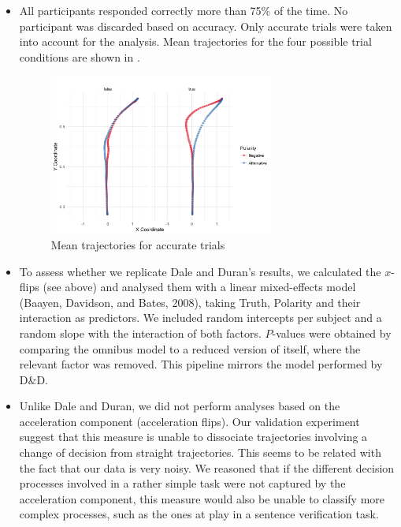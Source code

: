 \documentclass{article}
\begin{document}
\begin{itemize}
\item All participants responded correctly more than 75\% of the time. No participant was discarded based on accuracy.  Only accurate trials were taken into account for the analysis. Mean trajectories for the four possible trial conditions are shown in . 

\begin{figure}
\centering
\includegraphics[width=0.7\textwidth]{negation-data-mean-trajectory.png}
\caption{Mean trajectories for accurate trials} \label{fig:mean.trajectory-negation}
\end{figure}

\item To assess whether we replicate Dale and Duran's results, we calculated the $x$-flips (see above) and analysed them with a linear mixed-effects model (Baayen, Davidson, and Bates, 2008), taking Truth, Polarity and their interaction as predictors. We included random intercepts per subject and a random slope with the interaction of both factors. $P$-values were obtained by comparing the omnibus model to a reduced version of itself, where the relevant factor was removed. This pipeline mirrors the model performed by D\&D. 

\item Unlike Dale and Duran, we did not perform analyses based on the acceleration component (acceleration flips). Our validation experiment suggest that this measure is unable to dissociate trajectories involving a change of decision from straight trajectories. This seems to be related with the fact that our data is very noisy. 
We reasoned that if the different decision processes involved in a rather simple task were not captured by the acceleration component, this measure would also be unable to classify more complex processes, such as the ones at play in a sentence verification task. 


\end{itemize}
\end{document}
